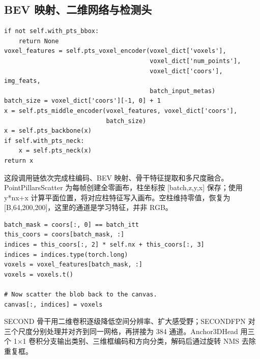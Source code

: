 \documentclass[UTF8,zihao=-4,fontset=windows]{ctexart}
\begin{document}
\subsection{BEV 映射、二维网络与检测头}

\begin{lstlisting}[caption={源码摘录：MVXTwoStageDetector.extract\_pts\_feat()，detectors/\allowbreak{}mvx\_two\_stage.py 第 207-219 行。}]
if not self.with_pts_bbox:
    return None
voxel_features = self.pts_voxel_encoder(voxel_dict['voxels'],
                                        voxel_dict['num_points'],
                                        voxel_dict['coors'], img_feats,
                                        batch_input_metas)
batch_size = voxel_dict['coors'][-1, 0] + 1
x = self.pts_middle_encoder(voxel_features, voxel_dict['coors'],
                            batch_size)
x = self.pts_backbone(x)
if self.with_pts_neck:
    x = self.pts_neck(x)
return x
\end{lstlisting}

这段调用链依次完成柱编码、BEV 映射、骨干特征提取和多尺度融合。PointPillarsScatter 为每帧创建全零画布，柱坐标按 [batch,z,y,x] 保存；使用 y*nx+x 计算平面位置，将对应柱特征写入画布。空柱维持零值，恢复为 [B,64,200,200]，这里的通道是学习特征，并非 RGB。


\begin{lstlisting}[caption={源码摘录：PointPillarsScatter.forward\_batch()，middle\_encoders/\allowbreak{}pillar\_scatter.py 第 85-93 行。}]
batch_mask = coors[:, 0] == batch_itt
this_coors = coors[batch_mask, :]
indices = this_coors[:, 2] * self.nx + this_coors[:, 3]
indices = indices.type(torch.long)
voxels = voxel_features[batch_mask, :]
voxels = voxels.t()

# Now scatter the blob back to the canvas.
canvas[:, indices] = voxels
\end{lstlisting}

SECOND 骨干用二维卷积逐级降低空间分辨率、扩大感受野；SECONDFPN 对三个尺度分别处理并对齐到同一网格，再拼接为 384 通道。Anchor3DHead 用三个 1×1 卷积分支输出类别、三维框编码和方向分类，解码后通过旋转 NMS 去除重复框。
\end{document}
